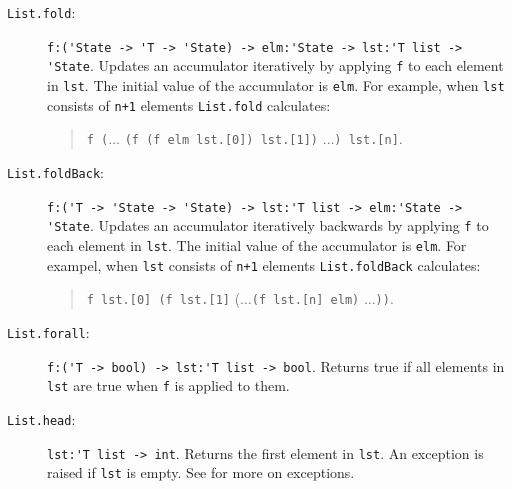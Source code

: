 \documentclass[fsharpnotes.tex]{subfiles}
\begin{document}
\begin{description}
\item[\texttt{List.fold}:] \lstinline{f:('State -> 'T -> 'State) -> elm:'State -> lst:'T list -> 'State}. Updates an accumulator iteratively by applying \lstinline{f} to each element in \lstinline{lst}. The initial value of the accumulator is \lstinline{elm}. For example, when \lstinline{lst} consists of \lstinline{n+1} elements
  \lstinline{List.fold} calculates:
  \begin{quote}
    \lstinline{f (}$\ldots$ \lstinline{(f (f elm lst.[0]) lst.[1])} $\ldots$\lstinline{) lst.[n]}.
  \end{quote}
\item[\texttt{List.foldBack}:] \lstinline{f:('T -> 'State -> 'State) -> lst:'T list -> elm:'State -> 'State}. Updates an accumulator iteratively backwards by applying \lstinline{f} to each element in \lstinline{lst}. The initial value of the accumulator is \lstinline{elm}. For exampel, when \lstinline{lst} consists of \lstinline{n+1} elements
  \lstinline{List.foldBack} calculates:
  \begin{quote}
    \lstinline{f lst.[0] (f lst.[1]} ($\ldots$\lstinline{(f lst.[n] elm)} $\ldots$\lstinline{))}.
  \end{quote}
\item[\texttt{List.forall}:] \lstinline{f:('T -> bool) -> lst:'T list -> bool}. Returns true if all elements in \lstinline{lst} are true when \lstinline{f} is applied to them.
\item[\texttt{List.head}:] \lstinline{lst:'T list -> int}. Returns the first element in \lstinline{lst}. An exception is raised if \lstinline{lst} is empty. See  for more on exceptions.

\end{description}
\end{document}
